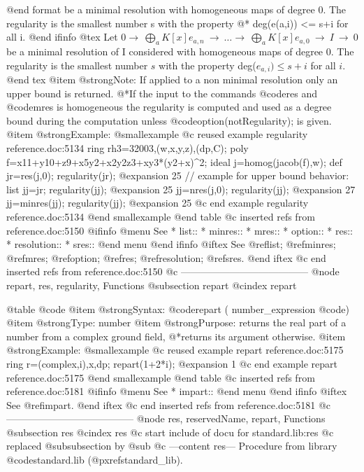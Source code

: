 {{{{{{@end format
be a minimal resolution with homogeneous maps of degree 0.
The regularity is the smallest number s with the property @*
deg(e(a,i)) <= s+i for all i.
@end ifinfo
@tex
\noindent
Let $0 \rightarrow\ \bigoplus_a K[x]e_{a,n}\ \rightarrow\ \dots
  \rightarrow\ \bigoplus_a K[x]e_{a,0}\ \rightarrow\
  I\ \rightarrow\ 0$
be a minimal resolution of I considered with homogeneous maps of degree 0.
The regularity is the smallest number $s$ with the property deg($e_{a,i})
 \leq s+i$ for all $i$.
@end tex
@item @strong{Note:}
If applied to a non minimal resolution only an upper bound is returned.
@*If the input to the commands @code{res} and @code{mres} is homogeneous
the regularity is computed and used as a degree bound during
the computation unless @code{option(notRegularity);} is given.
@item @strong{Example:}
@smallexample
@c reused example regularity reference.doc:5134 
  ring rh3=32003,(w,x,y,z),(dp,C);
  poly f=x11+y10+z9+x5y2+x2y2z3+xy3*(y2+x)^2;
  ideal j=homog(jacob(f),w);
  def jr=res(j,0);
  regularity(jr);
@expansion{} 25
  // example for upper bound behavior:
  list jj=jr;
  regularity(jj);
@expansion{} 25
  jj=nres(j,0);
  regularity(jj);
@expansion{} 27
  jj=minres(jj);
  regularity(jj);
@expansion{} 25
@c end example regularity reference.doc:5134
@end smallexample
@end table
@c inserted refs from reference.doc:5150
@ifinfo
@menu
See
* list::
* minres::
* mres::
* option::
* res::
* resolution::
* sres::
@end menu
@end ifinfo
@iftex
See
@ref{list};
@ref{minres};
@ref{mres};
@ref{option};
@ref{res};
@ref{resolution};
@ref{sres}.
@end iftex
@c end inserted refs from reference.doc:5150
@c ---------------------------------------
@node repart, res, regularity, Functions
@subsection repart
@cindex repart

@table @code
@item @strong{Syntax:}
@code{repart (} number_expression @code{)}
@item @strong{Type:}
number
@item @strong{Purpose:}
returns the real part of a number from a complex ground field,
@*returns its argument otherwise.
@item @strong{Example:}
@smallexample
@c reused example repart reference.doc:5175 
  ring r=(complex,i),x,dp;
  repart(1+2*i);
@expansion{} 1
@c end example repart reference.doc:5175
@end smallexample
@end table
@c inserted refs from reference.doc:5181
@ifinfo
@menu
See
* impart::
@end menu
@end ifinfo
@iftex
See
@ref{impart}.
@end iftex
@c end inserted refs from reference.doc:5181
@c ---------------------------------------
@node  res, reservedName, repart, Functions
@subsection res
@cindex res
@c start include of docu for standard.lib:res
@c replaced @subsubsection by @sub
@c ---content res---
Procedure from library @code{standard.lib} (@pxref{standard_lib}).

}}}}}}
